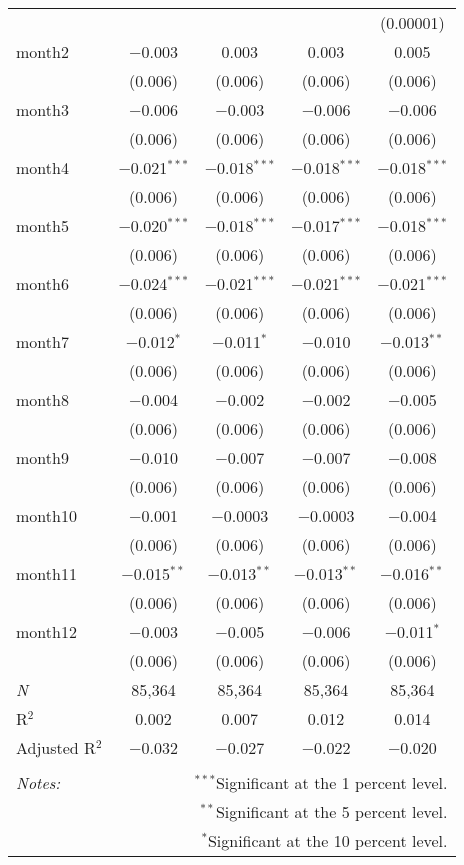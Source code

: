\begin{table}[!htbp]
\begin{tabular}{@{\extracolsep{5pt}}lcccc}
  &  &  &  & (0.00001) \\ 
  month2 & $-$0.003 & 0.003 & 0.003 & 0.005 \\ 
  & (0.006) & (0.006) & (0.006) & (0.006) \\ 
  month3 & $-$0.006 & $-$0.003 & $-$0.006 & $-$0.006 \\ 
  & (0.006) & (0.006) & (0.006) & (0.006) \\ 
  month4 & $-$0.021$^{***}$ & $-$0.018$^{***}$ & $-$0.018$^{***}$ & $-$0.018$^{***}$ \\ 
  & (0.006) & (0.006) & (0.006) & (0.006) \\ 
  month5 & $-$0.020$^{***}$ & $-$0.018$^{***}$ & $-$0.017$^{***}$ & $-$0.018$^{***}$ \\ 
  & (0.006) & (0.006) & (0.006) & (0.006) \\ 
  month6 & $-$0.024$^{***}$ & $-$0.021$^{***}$ & $-$0.021$^{***}$ & $-$0.021$^{***}$ \\ 
  & (0.006) & (0.006) & (0.006) & (0.006) \\ 
  month7 & $-$0.012$^{*}$ & $-$0.011$^{*}$ & $-$0.010 & $-$0.013$^{**}$ \\ 
  & (0.006) & (0.006) & (0.006) & (0.006) \\ 
  month8 & $-$0.004 & $-$0.002 & $-$0.002 & $-$0.005 \\ 
  & (0.006) & (0.006) & (0.006) & (0.006) \\ 
  month9 & $-$0.010 & $-$0.007 & $-$0.007 & $-$0.008 \\ 
  & (0.006) & (0.006) & (0.006) & (0.006) \\ 
  month10 & $-$0.001 & $-$0.0003 & $-$0.0003 & $-$0.004 \\ 
  & (0.006) & (0.006) & (0.006) & (0.006) \\ 
  month11 & $-$0.015$^{**}$ & $-$0.013$^{**}$ & $-$0.013$^{**}$ & $-$0.016$^{**}$ \\ 
  & (0.006) & (0.006) & (0.006) & (0.006) \\ 
  month12 & $-$0.003 & $-$0.005 & $-$0.006 & $-$0.011$^{*}$ \\ 
  & (0.006) & (0.006) & (0.006) & (0.006) \\ 
 \textit{N} & 85,364 & 85,364 & 85,364 & 85,364 \\ 
R$^{2}$ & 0.002 & 0.007 & 0.012 & 0.014 \\ 
Adjusted R$^{2}$ & $-$0.032 & $-$0.027 & $-$0.022 & $-$0.020 \\ 
\hline 
\hline \\[-1.8ex] 
\textit{Notes:} & \multicolumn{4}{r}{$^{***}$Significant at the 1 percent level.} \\ 
 & \multicolumn{4}{r}{$^{**}$Significant at the 5 percent level.} \\ 
 & \multicolumn{4}{r}{$^{*}$Significant at the 10 percent level.} \\ 
\end{tabular} 
\end{table} 
